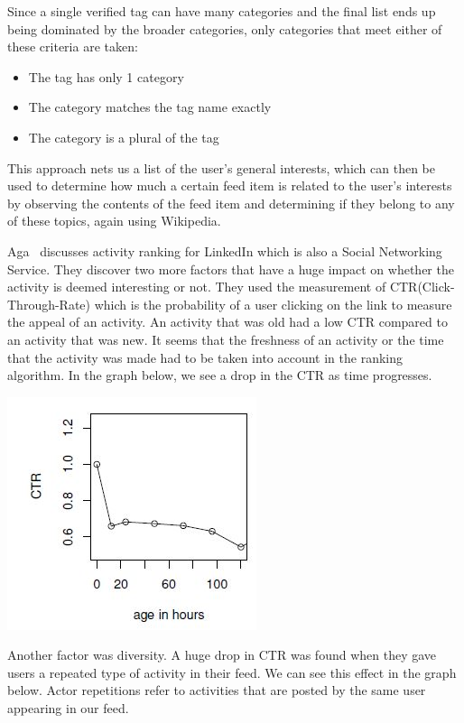 Since a single verified tag can have many categories and the final list ends up being dominated by the broader categories, only categories that meet either of these criteria are taken:
\begin{itemize}
\item The tag has only 1 category
\item The category matches the tag name exactly
\item The category is a plural of the tag
\end{itemize}

This approach nets us a list of the user's general interests, which can then be used to determine how much a certain feed item is related to the user's interests by observing the contents of the feed item and determining if they belong to any of these topics, again using Wikipedia.

Aga~\cite{Aga2014} discusses activity ranking for LinkedIn which is also a Social Networking Service. They discover two more factors that have a huge impact on whether the activity is deemed interesting or not. They used the measurement of CTR(Click-Through-Rate) which is the probability of a user clicking on the link to measure the appeal of an activity. An activity that was old had a low CTR compared to an activity that was new. It seems that the freshness of an activity or the time that the activity was made had to be taken into account in the ranking algorithm. In the graph below, we see a drop in the CTR as time progresses.

\begin{center}
\includegraphics[scale=0.8]{images/freshness.jpg}
\end{center}

Another factor was diversity. A huge drop in CTR was found when they gave users a repeated type of activity in their feed. We can see this effect in the graph below. Actor repetitions refer to activities that are posted by the same user appearing in our feed.

